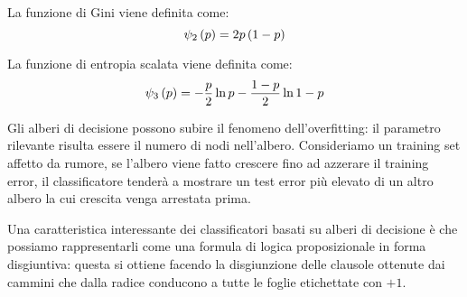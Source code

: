 \documentclass[\main/main.tex]{subfiles}
\begin{document}
\begin{multicols}{2}
\begin{definition}
    La funzione di Gini viene definita come:
    \[
        \psi_2\left(p\right) = 2p\left(1-p\right)
    \]
\end{definition}
\begin{definition}
    La funzione di entropia scalata viene definita come:
    \[
        \psi_3\left(p\right) = -\frac{p}{2}\ln{p} - \frac{1-p}{2}\ln{1-p}
    \]
\end{definition}
\begin{observation}
    Gli alberi di decisione possono subire il fenomeno dell'overfitting: il parametro rilevante risulta essere il numero di nodi nell'albero. Consideriamo un training set affetto da rumore, se l'albero viene fatto crescere fino ad azzerare il training error, il classificatore tenderà a mostrare un test error più elevato di un altro albero la cui crescita venga arrestata prima.
\end{observation}
\begin{observation}
    Una caratteristica interessante dei classificatori basati su alberi di decisione è che possiamo rappresentarli come una formula di logica proposizionale in forma disgiuntiva: questa si ottiene facendo la disgiunzione delle clausole ottenute dai cammini che dalla radice conducono a tutte le foglie etichettate con \(+1\).
\end{observation}
\end{multicols}
\end{document}

